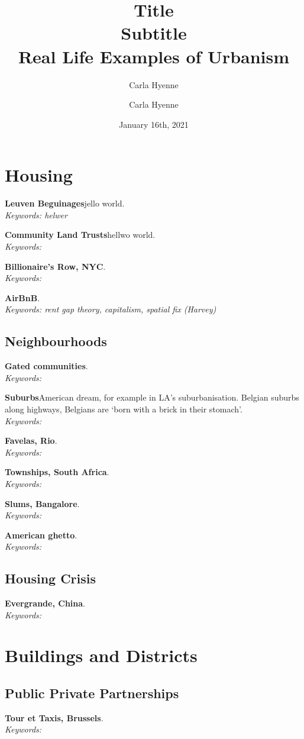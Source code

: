 \documentclass{article}
\title{Title
\\[5ex]Subtitle \\[3ex]}
\author{Carla Hyenne}
\date{January 16th, 2021}
\title{Real Life Examples of Urbanism}
\author{Carla Hyenne}
\newcommand{\entry}[3]{\textbf{#1}\quad #2. \\\textit{Keywords: #3}}
\begin{document}
\maketitle

\tableofcontents

\pagebreak

\section{Housing}

\entry{Leuven Beguinages}{jello world}{helwer}

\entry{Community Land Trusts}{hellwo world}{}

\entry{Billionaire's Row, NYC}{}{}

\entry{AirBnB}{}{rent gap theory, capitalism, spatial fix (Harvey)}

\subsection{Neighbourhoods}

\entry{Gated communities}{}{}

\entry{Suburbs}{American dream, for example in LA's suburbanisation. Belgian suburbs along highways, Belgians are `born with a brick in their stomach'}{}

\entry{Favelas, Rio}{}{}

\entry{Townships, South Africa}{}{}

\entry{Slums, Bangalore}{}{}

\entry{American ghetto}{}{}

\subsection{Housing Crisis}

\entry{Evergrande, China}{}{}

\section{Buildings and Districts}

\subsection{Public Private Partnerships}

\entry{Tour et Taxis, Brussels}{}{}
\end{document}
